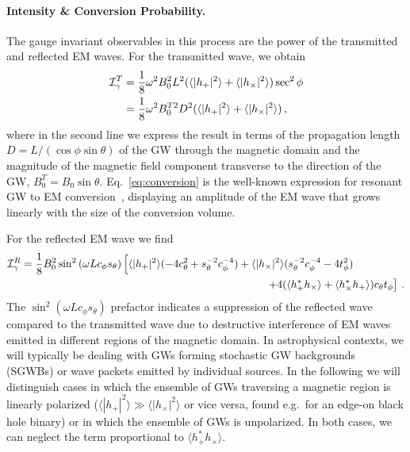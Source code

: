 \documentclass[a4paper,11pt]{article}
\begin{document}
\paragraph{Intensity \& Conversion Probability.} 


The gauge invariant observables in this process are the power of the transmitted and reflected EM waves. For the transmitted wave, we obtain
%
\begin{equation}
    \begin{aligned}
    \mathcal{I}_{\rm \gamma}^{T} 
    & = \frac{1}{8} \omega^{2} B_{0}^{2} L^{2} ( \langle \vert h_{+} \vert^{2} \rangle + \langle \vert h_{\times} \vert^{2} \rangle )  \sec^{2} \phi
     \\
    &  = \frac{1}{8} \omega^{2} B_{0}^{T 2} D^{2} ( \langle \vert h_{+} \vert^{2} \rangle + \langle \vert h_{\times} \vert^{2} \rangle )\,,
    \label{eq:conversion}
    \end{aligned}
\end{equation}
%
where in the second line we express the result in terms of the propagation length $ D = L/(\cos \phi \sin \theta ) $ of the GW through the magnetic domain and the magnitude of the magnetic field component transverse to the direction of the GW, $ B_{0}^{T} =  B_{0} \sin \theta $.
%
Eq.~\eqref{eq:conversion} is the well-known expression for resonant GW to EM conversion~\cite{Gertsenshtein,Raffelt:1987im,Domcke:2020yzq}, displaying an amplitude of the EM wave that grows linearly with the size of the conversion volume.



For the reflected EM wave we find
%
\begin{equation}
    \begin{aligned}
    \mathcal{I}_{\gamma}^{R}  & = \frac{1}{8} B_{0}^{2}  \sin^{2} \left( \omega L c_{\phi} s_{\theta} \right) \left[ \langle \vert h_{+} \vert^{2}  \rangle ( - 4 c_{\theta}^{2} + s_{\theta}^{-2} c_{\phi}^{-4} ) + \langle \vert h_{\times} \vert^{2} \rangle ( s_{\theta}^{-2}  c_{\phi}^{-4} - 4 t_{\phi}^{2}  )
   \right. \\
   & \hspace{8 cm} \left. + 4 (\langle h_{+}^{*} h_{\times} \rangle + \langle h_{\times}^{*} h_{+} \rangle ) c_{\theta} t_{\phi} \right] \, .
    \end{aligned}
\end{equation}
%
The $  \sin^{2} \left( \omega L c_{\phi} s_{\theta} \right) $ prefactor indicates a suppression of the reflected wave compared to the transmitted wave due to destructive interference of EM waves emitted in different regions of the magnetic domain.
%
In astrophysical contexts, we will typically be dealing with GWs forming stochastic GW backgrounds (SGWBs) or wave packets emitted by individual sources. In the following we will distinguish cases in which the ensemble of GWs traversing a magnetic region is linearly polarized ($\langle |h_+|^{2} \rangle \gg \langle |h_\times|^{2} \rangle $ or vice versa, found e.g.\ for an edge-on black hole binary) or in which the ensemble of GWs is unpolarized.
%
In both cases, we can neglect the term proportional to $ \langle h_{+}^{*} h_{\times} \rangle$.
\end{document}
